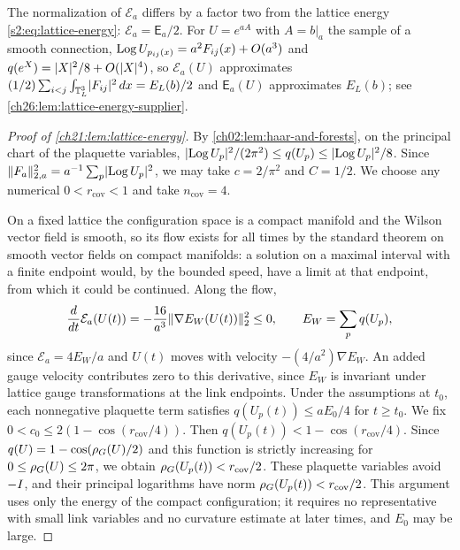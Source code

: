 The normalization of $\mathcal E_a$ differs by a factor two from the lattice energy \eqref{s2:eq:lattice-energy}: $\mathcal E_a=\mathsf E_a/2$. For $U=e^{aA}$ with $A=b|_a$ the sample of a smooth connection, $\operatorname{Log} U_{p_{ij}(x)}=a^2F_{ij}(x)+O(a^3)$ and $q(e^X)=\lvert X\rvert^2/8+O(\lvert X\rvert^4)$, so $\mathcal E_a(U)$ approximates $(1/2)\sum_{i<j}\int_{\mathbb T_L^3}\lvert F_{ij}\rvert^2\,dx=E_L(b)/2$ and $\mathsf E_a(U)$ approximates $E_L(b)$; see \cref{ch26:lem:lattice-energy-supplier}.

\begin{proof}[Proof of \cref{ch21:lem:lattice-energy}]
By \cref{ch02:lem:haar-and-forests}, on the principal chart of the plaquette variables, $\lvert \operatorname{Log} U_p\rvert^2/(2\pi^2)\le q(U_p)\le\lvert \operatorname{Log} U_p\rvert^2/8$. Since $\lVert F_a\rVert_{2,a}^2=a^{-1}\sum_p\lvert \operatorname{Log} U_p\rvert^2$, we may take $c=2/\pi^2$ and $C=1/2$. We choose any numerical $0<r_{\mathrm{cov}}<1$ and take $n_{\mathrm{cov}}=4$.

On a fixed lattice the configuration space is a compact manifold and the Wilson vector field is smooth, so its flow exists for all times by the standard theorem on smooth vector fields on compact manifolds: a solution on a maximal interval with a finite endpoint would, by the bounded speed, have a limit at that endpoint, from which it could be continued. Along the flow,
\begin{equation}\label{ch21:eq:lattice-energy-descent}
 \frac{d}{dt}\mathcal E_a(U(t))=-\frac{16}{a^3}\lVert \nabla E_W(U(t))\rVert_2^2\le0,\qquad E_W=\sum_pq(U_p),
\end{equation}
since $\mathcal E_a=4E_W/a$ and $U(t)$ moves with velocity $-(4/a^2)\nabla E_W$. An added gauge velocity contributes zero to this derivative, since $E_W$ is invariant under lattice gauge transformations at the link endpoints. Under the assumptions at $t_0$, each nonnegative plaquette term satisfies $q(U_p(t))\le aE_0/4$ for $t\ge t_0$. We fix $0<c_0\le2(1-\cos(r_{\mathrm{cov}}/4))$. Then $q(U_p(t))<1-\cos(r_{\mathrm{cov}}/4)$. Since $q(U)=1-\cos(\rho_G(U)/2)$ and this function is strictly increasing for $0\le\rho_G(U)\le2\pi$, we obtain $\rho_G(U_p(t))<r_{\mathrm{cov}}/2$. These plaquette variables avoid $-I$, and their principal logarithms have norm $\rho_G(U_p(t))<r_{\mathrm{cov}}/2$. This argument uses only the energy of the compact configuration; it requires no representative with small link variables and no curvature estimate at later times, and $E_0$ may be large.
\end{proof}

